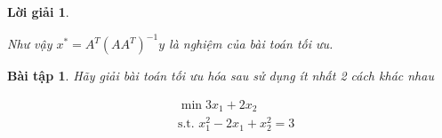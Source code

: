 \documentclass[14pt, a4paper]{article}
\theoremstyle{sltheorem}
\newtheorem{baitap}{Bài tập}
\theoremstyle{soltheorem}
\newtheorem*{loigiai}{Lời giải}
\begin{document}
\begin{loigiai}
\begin{enumerate} [wide, labelwidth=!, labelindent=0pt,label=\textbf{\arabic*}.]
            Như vậy $x^* = A^T (A A^T)^{-1}y$ là nghiệm của bài toán tối ưu.
            
        \end{enumerate}
    \end{loigiai}

    \begin{baitap}
        Hãy giải bài toán tối ưu hóa sau sử dụng ít nhất 2 cách khác nhau

        \begin{equation*}
            \begin{aligned}
                &\min 3 x_1 + 2x_2 \\ &\text{s.t. }x_1^2 - 2 x_1 + x_2^2 = 3
            \end{aligned}
        \end{equation*}
    \end{baitap}
\end{document}
